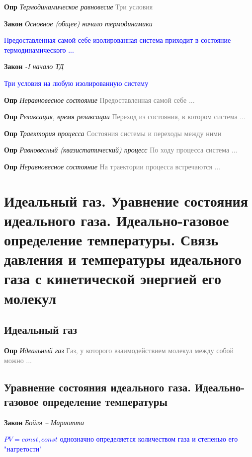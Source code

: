 \documentclass[a4paper, 14pt]{article}
\begin{document}
    \textbf{Опр} \textit{Термодинамическое равновесие} \textcolor{gray}{Три условия}

    \textbf{Закон} \textit{Основное (общее) начало термодинамики}

    \textcolor{blue}{Предоставленная самой себе изолированная система приходит в состояние термодинамического ...}

    \textbf{Закон} \textit{-I начало ТД}

    \textcolor{blue}{Три условия на любую изолированную систему}

    \textbf{Опр} \textit{Неравновесное состояние} \textcolor{gray}{Предоставленная самой себе ...}

    \textbf{Опр} \textit{Релаксация, время релаксации} \textcolor{gray}{Переход из состояния, в котором система ...}

    \textbf{Опр} \textit{Траектория процесса} \textcolor{gray}{Состояния системы и переходы между ними}

    \textbf{Опр} \textit{Равновесный (квазистатический) процесс} \textcolor{gray}{По ходу процесса система ...}

    \textbf{Опр} \textit{Неравновесное состояние} \textcolor{gray}{На траектории процесса встречаются ...}

    \section{Идеальный газ.
    Уравнение состояния идеального газа.
    Идеально-газовое определение температуры.
    Связь давления и температуры идеального газа с кинетической энергией его молекул}

    \subsection{Идеальный газ}

    \textbf{Опр} \textit{Идеальный газ} \textcolor{gray}{Газ, у которого взаимодействием молекул между собой можно ...}

    \subsection{Уравнение состояния идеального газа. Идеально-газовое определение температуры}

    \textbf{Закон} \textit{Бойля -- Мариотта}

    \textcolor{blue}{$PV = const, const$ однозначно определяется количеством газа и степенью его "нагретости"}
\end{document}
